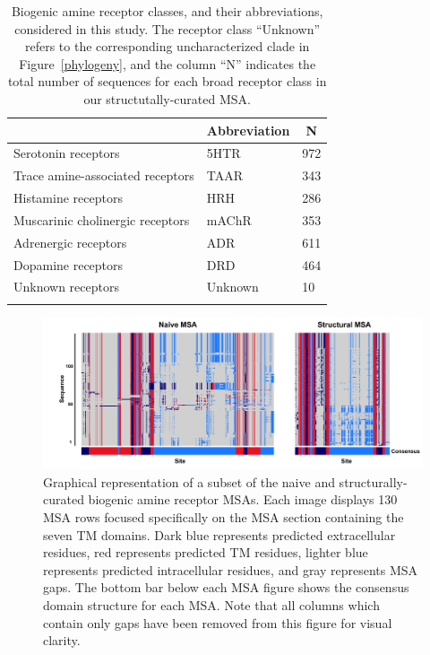 \documentclass[fleqn,10pt]{wlpeerj}
\begin{document}
\bigskip

\begin{table}[htbp]
	\centering
	\begin{tabular}{l l l}
		\hline\noalign{\smallskip}
		\multicolumn{1}{c}{Receptor Class} & \multicolumn{1}{c}{Abbreviation} & \multicolumn{1}{c}{N} \\
		\hline\noalign{\smallskip}
		Serotonin receptors & \quad 5HTR & 972  \\
		Trace amine-associated receptors & \quad TAAR & 343 \\
		Histamine receptors & \quad HRH & 286 \\
		Muscarinic cholinergic receptors & \quad mAChR & 353  \\
		Adrenergic receptors & \quad ADR & 611  \\
		Dopamine receptors & \quad DRD & 464 \\
		Unknown receptors & \quad Unknown & 10 \\
		\noalign{\smallskip}\hline\noalign{\smallskip} 
	\end{tabular}
	\caption{\label{tab:abbrev_count} Biogenic amine receptor classes, and their abbreviations, considered in this study. The receptor class ``Unknown'' refers to the corresponding uncharacterized clade in Figure~\ref{phylogeny}, and the column ``N'' indicates the total number of sequences for each broad receptor class in our structutally-curated MSA.}
\end{table}


\newpage

\begin{figure}[htbp]
	\centerline{\includegraphics[width=7in]{figures/domains_naive_struc.png}}
	\caption{\label{domains} Graphical representation of a subset of the naive and structurally-curated biogenic amine receptor MSAs. Each image displays 130 MSA rows focused specifically on the MSA section containing the seven TM domains. Dark blue represents predicted extracellular residues, red represents predicted TM residues, lighter blue represents predicted intracellular residues, and gray represents MSA gaps. The bottom bar below each MSA figure shows the consensus domain structure for each MSA. Note that all columns which contain only gaps have been removed from this figure for visual clarity.}
\end{figure}
\end{document}
